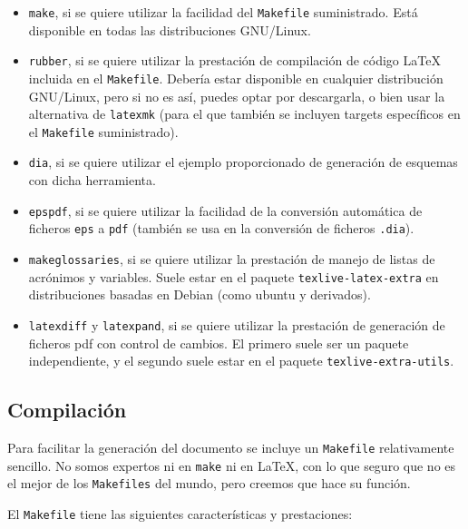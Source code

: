 \begin{itemize}
\item \texttt{make}, si se quiere utilizar la facilidad del
  \texttt{Makefile} suministrado. Está disponible en todas las
  distribuciones GNU/Linux.
\item \texttt{rubber}, si se quiere utilizar la prestación de
  compilación de código \LaTeX{} incluida en el
  \texttt{Makefile}. Debería estar disponible en cualquier distribución
  GNU/Linux, pero si no es así, puedes optar por descargarla, o bien
  usar la alternativa de \texttt{latexmk} (para el que también se
  incluyen targets específicos en el \texttt{Makefile} suministrado).
\item \texttt{dia}, si se quiere utilizar el ejemplo proporcionado de
  generación de esquemas con dicha herramienta.
\item \texttt{epspdf}, si se quiere utilizar la facilidad de la
  conversión automática de ficheros \texttt{eps} a \texttt{pdf} (también
  se usa en la conversión de ficheros \texttt{.dia}).
\item \texttt{makeglossaries}, si se quiere utilizar la prestación de
  manejo de listas de acrónimos y variables. Suele estar en el paquete
  \texttt{texlive-latex-extra} en distribuciones basadas en Debian
  (como ubuntu y derivados).
\item \texttt{latexdiff} y \texttt{latexpand}, si se quiere utilizar la
  prestación de generación de ficheros pdf con control de cambios. El
  primero suele ser un paquete independiente, y el segundo suele estar
  en el paquete \texttt{texlive-extra-utils}.
\end{itemize}


\subsection{Compilación}
\label{sec:compilacion}

Para facilitar la generación del documento se incluye un
\texttt{Makefile} relativamente sencillo. No somos expertos ni en
\texttt{make} ni en \LaTeX, con lo que seguro que no es el mejor de los
\texttt{Makefiles} del mundo, pero creemos que hace su función.

El \texttt{Makefile} tiene las siguientes características y
prestaciones:

